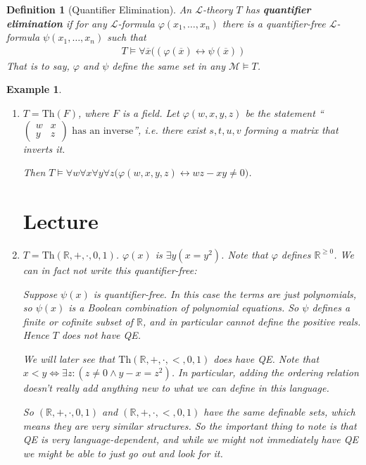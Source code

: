 \documentclass[]{article}
\theoremstyle{custhm}
\theoremstyle{cusdef}
\newtheorem{defin}[theorem]{Definition}
\theoremstyle{custhm}
\theoremstyle{custhm}
\theoremstyle{custhm}
\theoremstyle{ex}
\newtheorem{ex}[theorem]{Example}
\theoremstyle{custhm}
\theoremstyle{cusdef}
\theoremstyle{remark}
\theoremstyle{remark}
\theoremstyle{numremark}
\newcommand{\R}{\mathbb{R}}
\newcommand{\undf}[1]{\textit{\textbf{#1}}}
\renewcommand{\L}{\mathcal{L}}
\renewcommand{\it}[1]{\textit{#1}}
\newcommand{\M}{\mathcal{M}}
\renewcommand{\phi}{\varphi}
\renewcommand{\bar}{\overline}
\newcommand{\Th}{\textrm{Th}}
\begin{document}
\begin{defin}[Quantifier Elimination]
An $\L$-theory $T$ has \undf{quantifier elimination} if for any $\L$-formula $\phi(x_1,\dots,x_n)$ there is a quantifier-free $\L$-formula $\psi(x_1,\dots,x_n)$ such that
\begin{align*}
T\models \forall \bar{x}\big((\phi(\bar{x})\leftrightarrow \psi(\bar{x}))
\end{align*}
That is to say, $\phi$ and $\psi$ define the same set in any $\M\models T$.
\end{defin}

\begin{ex}\ 
\begin{enumerate}[label=(\arabic*)]
\item $T = \Th(F)$, where $F$ is a field. Let $\phi(w,x,y,z)$ be the statement ``$\left(\begin{array}{cc} w & x\\ y & z\end{array}\right)\textrm{ has an inverse}$'', {\it i.e.} there exist $s,t,u,v$ forming a matrix that inverts it.

Then $T\models \forall w\forall x\forall y\forall z\big(\phi(w,x,y,z)\leftrightarrow wz-xy\ne 0\big)$.

\section{Lecture}

\item $T = \Th(\R,+,\cdot,0,1)$. $\phi(x)$ is $\exists y(x = y^2)$. Note that $\phi$ defines $\R^{\ge 0}$. We can in fact not write this quantifier-free:

Suppose $\psi(x)$ is quantifier-free. In this case the terms are just polynomials, so $\psi(x)$ is a Boolean combination of polynomial equations. So $\psi$ defines a finite or cofinite subset of $\R$, and in particular cannot define the positive reals. Hence $T$ does not have QE.

We will later see that $\Th(\R,+,\cdot,<,0,1)$ {\it does} have QE. Note that $x < y \iff \exists z: (z\ne 0 \land y-x = z^2)$. In particular, adding the ordering relation doesn't really add anything new to what we can define in this language.

So $(\R,+,\cdot,0,1)$ and $(\R,+,\cdot,<,0,1)$ have the same definable sets, which means they are very similar structures. So the important thing to note is that QE is very language-dependent, and while we might not immediately have QE we might be able to just go out and look for it.
\end{enumerate}
\end{ex}
\end{document}
